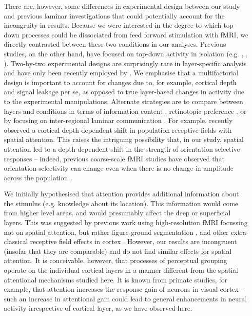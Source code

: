 \documentclass[9pt,lineno]{aperture}
\begin{document}
There are, however, some differences in experimental design between our study and previous laminar investigations that could potentially account for the incongruity in results. Because we were interested in the degree to which top-down processes could be dissociated from feed forward stimulation with fMRI, we directly contrasted between these two conditions in our analyses. Previous studies, on the other hand, have focused on top-down activity in isolation (e.g. \citet{Muckli2015}, \citet{Kok2016}, \citet{Lawrence2018}). Two-by-two experimental designs are surprisingly rare in layer-specific analysis and have only been recently employed by \citet{DeHollander2020}. We emphasise that a multifactorial design is important to account for changes due to, for example, cortical depth and signal leakage per se, as opposed to true layer-based changes in activity due to the experimental manipulations. Alternate strategies are to compare between layers and conditions in terms of information content \citep{Muckli2015}, retinotopic preference \citep{Klein2018}, or by focusing on inter-regional laminar communication \citep{Sharoh2019}. For example, \citet{Klein2018} recently observed a cortical depth-dependent shift in population receptive fields with spatial attention. This raises the intriguing possibility that, in our study, spatial attention led to a depth-dependent shift in the strength of orientation-selective responses – indeed, previous coarse-scale fMRI studies have observed that orientation selectivity can change even when there is no change in amplitude across the population \citep{Jehee2011,Jehee2012}.

We initially hypothesised that attention provides additional information about the stimulus (e.g. knowledge about its location). This information would come from higher level areas, and would presumably affect the deep or superficial layers. This was suggested by previous work using high-resolution fMRI focussing not on spatial attention, but rather figure-ground segmentation \citep{Kok2016}, and other extra-classical receptive field effects in cortex \citep{Muckli2015}. However, our results are incongruent (insofar that they are comparable) and do not find similar effects for spatial attention. It is conceivable, however, that processes of perceptual grouping operate on the individual cortical layers in a manner different from the spatial attentional mechanisms studied here. It is known from primate studies, for example, that attention increases the response gain of neurons in visual cortex \citep{Treue1999,MartinezTrujillo2004} - such an increase in attentional gain could lead to general enhancements in neural activity irrespective of cortical layer, as we have observed here.
\end{document}
